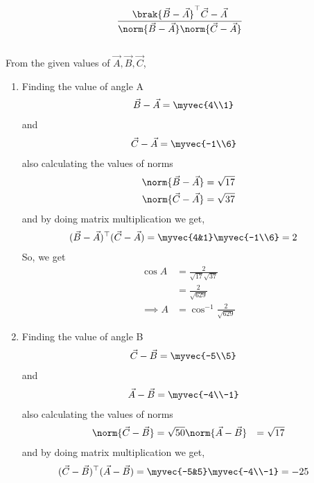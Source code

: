 \documentclass[11pt]{book}
\begin{document}
\begin{enumerate}[label=\thesection.\arabic*.,ref=\thesection.\theenumi]
\begin{align}
\frac{\brak{\vec{B}-\vec{A}}^{\top}{\vec{C}-\vec{A}}}{\norm{\vec{B}-\vec{A}}\norm{\vec{C}-\vec{A}}}
  \end{align}
\solution\\
From the given values of $\vec{A},\vec{B},\vec{C}$,\\
\begin{enumerate}
 \item Finding the value of angle A
\begin{align}
 \vec{B}-\vec{A} &=\myvec{4\\1}
\end{align}
and 
\begin{align}
 \vec{C}-\vec{A} &= \myvec{-1\\6}
\end{align}
also calculating the values of norms
\begin{align}
 \norm{\vec{B}-\vec{A}} &= \sqrt{17}\\
 \norm{\vec{C}-\vec{A}} &= \sqrt{37}
\end{align}
and by doing matrix multiplication we get,
\begin{align}
\begin{split}
 (\vec{B}-\vec{A})^{\top}(\vec{C}-\vec{A}) &= \myvec{4&1}\myvec{-1\\6} =2 
\end{split}
\end{align}
So, we get
\begin{align}
 \cos{A} &= \frac{2}{\sqrt{17} \sqrt{37}}\\
 &= \frac{2}{\sqrt{629}}\\
 \implies A& = \cos^{-1}{\frac{2}{\sqrt{629}}}
\end{align}
\item Finding the value of angle B
\begin{align}
 \vec{C}-\vec{B} &=\myvec{-5\\5}
\end{align}
and 
\begin{align}
 \vec{A}-\vec{B} &= \myvec{-4\\-1}
\end{align}
also calculating the values of norms
\begin{align}
 \norm{\vec{C}-\vec{B}} &= \sqrt{50}
 \norm{\vec{A}-\vec{B}} &= \sqrt{17}
\end{align}
and by doing matrix multiplication we get,
\begin{align}
\begin{split}
 (\vec{C}-\vec{B})^{\top}(\vec{A}-\vec{B}) &= \myvec{-5&5}\myvec{-4\\-1} = -25

\end{split}
\end{align}
\end{enumerate}
\end{enumerate}
\end{document}
